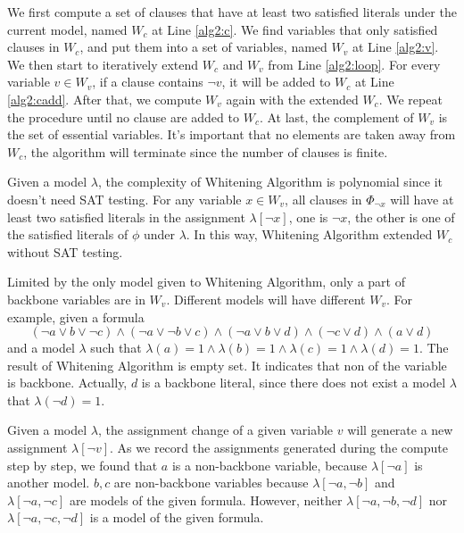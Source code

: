 We first compute a set of clauses that have at least two satisfied literals under the current model, named $W_c$ at Line \ref{alg2:c}. We find variables that only satisfied clauses in $W_c$, and put them into a set of variables, named $W_v$ at Line \ref{alg2:v}. We then start to iteratively extend $W_c$ and $W_v$ from Line \ref{alg2:loop}. For every variable $v\in W_v$, if a clause contains $\neg v$, it will be added to $W_c$ at Line \ref{alg2:cadd}. After that, we compute $W_v$ again with the extended $W_c$. We repeat the procedure until no clause are added to $W_c$. At last, the complement of $W_v$ is the set of essential variables. It's important that no elements are taken away from $W_c$, the algorithm will terminate since the number of clauses is finite.

Given a model $\lambda$, the complexity of Whitening Algorithm is polynomial since it doesn't need SAT testing. For any variable $x\in W_v$, all clauses in $\Phi_{\neg x}$ will have at least two satisfied literals in the assignment $\lambda[\neg x]$, one is $\neg x$, the other is one of the satisfied literals of $\phi$ under $\lambda$. In this way, Whitening Algorithm extended $W_c$ without SAT testing.

Limited by the only model given to Whitening Algorithm, only a part of backbone variables are in $W_v$. Different models will have different $W_v$. For example, given a formula
\[(\neg a\vee b\vee\neg c)\wedge(\neg a\vee\neg b\vee c)\wedge(\neg a\vee b\vee d)\wedge(\neg c\vee d)\wedge(a\vee d)\]
and a model $\lambda$ such that $\lambda(a)=1\wedge \lambda(b)=1\wedge \lambda(c)=1\wedge \lambda(d)=1$. The result of Whitening Algorithm is empty set. It indicates that non of the variable is backbone. Actually, $d$ is a backbone literal, since there does not exist a model $\lambda$ that $\lambda(\neg d)=1$.


Given a model $\lambda$, the assignment change of a given variable $v$ will generate a new assignment $\lambda[\neg v]$. As we record the assignments generated during the compute step by step, we found that $a$ is a non-backbone variable, because $\lambda[\neg a]$ is another model. $b,c$ are non-backbone variables because $\lambda[\neg a,\neg b]$ and $\lambda[\neg a,\neg c]$ are models of the given formula. However, neither $\lambda[\neg a,\neg b,\neg d]$ nor $\lambda[\neg a,\neg c,\neg d]$ is a model of the given formula.

